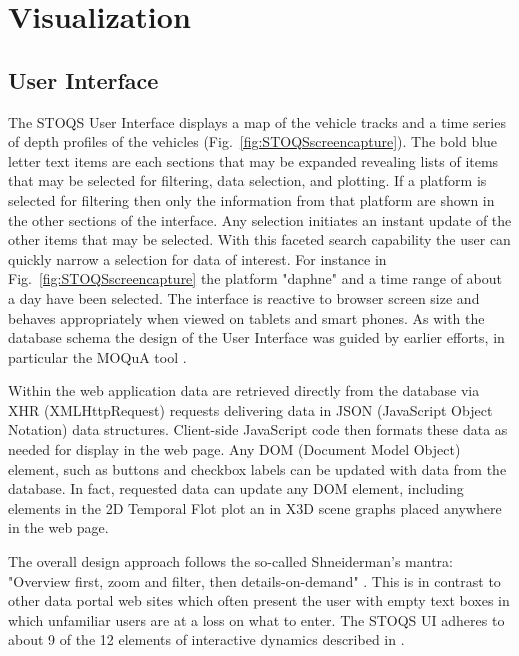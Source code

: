 \documentclass[conference]{IEEEtran}
\begin{document}
\section{Visualization}

\subsection{User Interface}

The STOQS User Interface displays a map of the vehicle tracks and a time series of depth profiles of the vehicles (Fig.~\ref{fig:STOQSscreencapture}). The bold blue letter text items are each sections that may be expanded revealing lists of items that may be selected for filtering, data selection, and plotting. If a platform is selected for filtering then only the information from that platform are shown in the other sections of the interface. Any selection initiates an instant update of the other items that may be selected. With this faceted search capability the user can quickly narrow a selection for data of interest. For instance in Fig.~\ref{fig:STOQSscreencapture} the platform "daphne"  and a time range of about a day have been selected. The interface is reactive to browser screen size and behaves appropriately when viewed on tablets and smart phones. As with the database schema the design of the User Interface was guided by earlier efforts, in particular the MOQuA tool \cite{godin05}.

Within the web application data are retrieved directly from the database via XHR (XMLHttpRequest) requests delivering data in JSON (JavaScript Object Notation) data structures. Client-side JavaScript code then formats these data as needed for display in the web page. Any DOM (Document Model Object) element, such as buttons and checkbox labels can be updated with data from the database. In fact, requested data can update any DOM element, including elements in the 2D Temporal Flot plot an in  X3D scene graphs placed anywhere in the web page.

The overall design approach follows the so-called Shneiderman's mantra: "Overview first, zoom and filter, then details-on-demand" \cite{Whitney:2012:DIN:2597850}. This is in contrast to other data portal web sites which often present the user with empty text boxes in which unfamiliar users are at a loss on what to enter. The STOQS UI adheres to about 9 of the 12 elements of interactive dynamics described in \cite{Heer:2012:IDV:2133416.2146416}.
\end{document}
